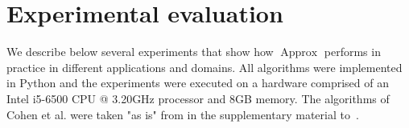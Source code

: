 \documentclass[letterpaper]{article} %
\newtheorem{theorem}[thm]{Theorem}
\DeclareMathOperator{\support}{support}
\DeclareMathOperator{\KlmApprox}{Approx}
\begin{document}








\section{Experimental evaluation}\label{sec:exp}

We describe below several experiments that show how $\KlmApprox$ performs in practice in different applications and domains.
All algorithms were implemented in Python and the experiments were executed on a hardware comprised of an Intel i5-6500 CPU @ 3.20GHz processor and 8GB memory. The algorithms of Cohen et al. were taken "as is" from in the supplementary material to~\cite{cohen2015estimating}.
\end{document}
